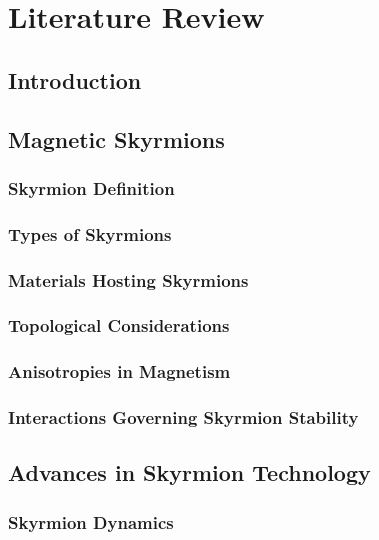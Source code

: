 \chapter{Literature Review}\label{ch:LitRev}
\section{Introduction}\label{sec:LitRevIntro}


\section{Magnetic Skyrmions}\label{sec:MagSkyrmions}

\subsection{Skyrmion Definition}\label{subsec:SkyrDefn}

\subsection{Types of Skyrmions}\label{subsec:TypesSkyrmions}

\subsection{Materials Hosting Skyrmions}\label{subsec:Materials}

\subsection{Topological Considerations}\label{subsec:TopConsiderations}

\subsection{Anisotropies in Magnetism}\label{subsec:Anisotropies}

\subsection{Interactions Governing Skyrmion Stability}

\section{Advances in Skyrmion Technology}
\subsection{Skyrmion Dynamics}

